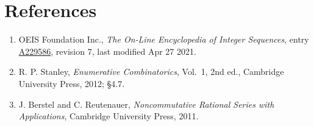 \documentclass[11pt]{article}
\theoremstyle{definition}
\begin{document}
\section{References}

\begin{enumerate}

\item OEIS Foundation Inc., \emph{The On-Line Encyclopedia of Integer Sequences}, entry \href{https://oeis.org/A229586}{A229586}, revision 7, last modified Apr 27 2021.

\item R. P. Stanley, \emph{Enumerative Combinatorics}, Vol.~1, 2nd ed., Cambridge University Press, 2012; \S4.7.

\item J. Berstel and C. Reutenauer, \emph{Noncommutative Rational Series with Applications}, Cambridge University Press, 2011.

\end{enumerate}
\end{document}
